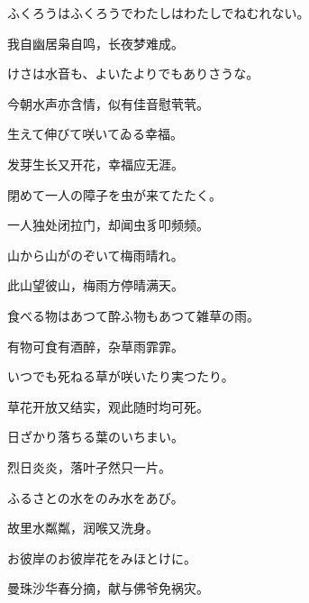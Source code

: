 \begin{haiku}
    {\FH ふくろうはふくろうでわたしはわたしでねむれない。}

    {\FK 我自幽居枭自鸣，长夜梦难成。}
\end{haiku}

\begin{haiku}
    {\FH けさは水音も、よいたよりでもありさうな。}

    {\FK 今朝水声亦含情，似有佳音慰茕茕。}
\end{haiku}

\begin{haiku}
    {\FH 生えて伸びて咲いてゐる幸福。}

    {\FK 发芽生长又开花，幸福应无涯。}
\end{haiku}

\begin{haiku}
    {\FH 閉めて一人の障子を虫が来てたたく。}

    {\FK 一人独处闭拉门，却闻虫豸叩频频。}
\end{haiku}

\begin{haiku}
    {\FH 山から山がのぞいて梅雨晴れ。}

    {\FK 此山望彼山，梅雨方停晴满天。}
\end{haiku}

\begin{haiku}
    {\FH 食べる物はあつて酔ふ物もあつて雑草の雨。}

    {\FK 有物可食有酒醉，杂草雨霏霏。}
\end{haiku}

\begin{haiku}
    {\FH いつでも死ねる草が咲いたり実つたり。}

    {\FK 草花开放又结实，观此随时均可死。}
\end{haiku}

\begin{haiku}
    {\FH 日ざかり落ちる葉のいちまい。}

    {\FK 烈日炎炎，落叶孑然只一片。}
\end{haiku}

\begin{haiku}
    {\FH ふるさとの水をのみ水をあび。}

    {\FK 故里水粼粼，润喉又洗身。}
\end{haiku}

\begin{haiku}
    {\FH お彼岸のお彼岸花をみほとけに。}

    {\FK 曼珠沙华春分摘，献与佛爷免祸灾。}
\end{haiku}

